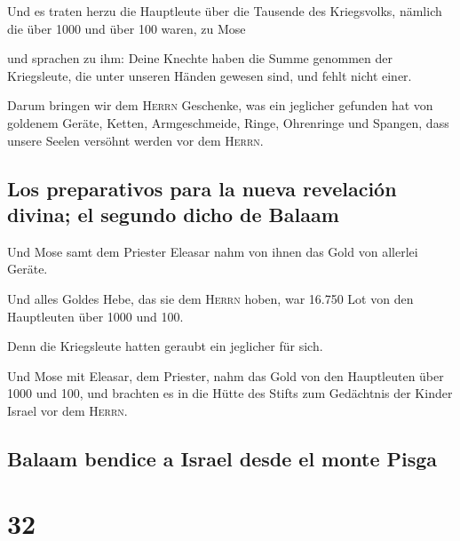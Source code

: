  Und es traten herzu die Hauptleute über die Tausende des
Kriegsvolks, nämlich die über 1000 und über 100 waren, zu Mose

 und sprachen zu ihm: Deine Knechte haben die Summe
genommen der Kriegsleute, die unter unseren Händen gewesen sind, und
fehlt nicht einer.

 Darum bringen wir dem \textsc{Herrn} Geschenke, was ein
jeglicher gefunden hat von goldenem Geräte, Ketten, Armgeschmeide,
Ringe, Ohrenringe und Spangen, dass unsere Seelen versöhnt werden vor
dem \textsc{Herrn}.

\hypertarget{los-preparativos-para-la-nueva-revelaciuxf3n-divina-el-segundo-dicho-de-balaam}{%
\subsection{Los preparativos para la nueva revelación divina; el segundo
dicho de
Balaam}\label{los-preparativos-para-la-nueva-revelaciuxf3n-divina-el-segundo-dicho-de-balaam}}

 Und Mose samt dem Priester Eleasar nahm von ihnen das
Gold von allerlei Geräte.

 Und alles Goldes Hebe, das sie dem \textsc{Herrn} hoben,
war 16.750 Lot von den Hauptleuten über 1000 und 100.

 Denn die Kriegsleute hatten geraubt ein jeglicher für
sich.

 Und Mose mit Eleasar, dem Priester, nahm das Gold von
den Hauptleuten über 1000 und 100, und brachten es in die Hütte des
Stifts zum Gedächtnis der Kinder Israel vor dem \textsc{Herrn}.

\hypertarget{balaam-bendice-a-israel-desde-el-monte-pisga}{%
\subsection{Balaam bendice a Israel desde el monte
Pisga}\label{balaam-bendice-a-israel-desde-el-monte-pisga}}

\hypertarget{section-31}{%
\section{32}\label{section-31}}

